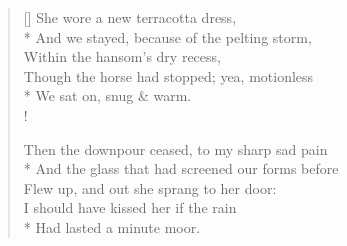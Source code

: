 \documentclass[MAIN]{subfiles}
\begin{document}
\settowidth{\versewidth}{How should I your true love know}
\begin{verse}[\versewidth]
She wore a new terracotta dress,\\*
And we stayed, because of the pelting storm,\\
Within the hansom's dry recess,\\
Though the horse had stopped; yea, motionless\\*
\vin We sat on, snug \& warm.\\!

Then the downpour ceased, to my sharp sad pain\\*
And the glass that had screened our forms before\\
Flew up, and out she sprang to her door:\\
I should have kissed her if the rain\\*
\vin Had lasted a minute moor.
\end{verse}
\end{document}

